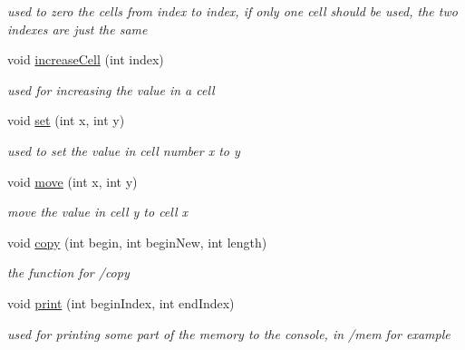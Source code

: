 \begin{DoxyCompactItemize}
\begin{DoxyCompactList}\small\item\em used to zero the cells from index to index, if only one cell should be used, the two indexes are just the same \end{DoxyCompactList}\item 
\mbox{\label{class_machine_a69c8f925175f153c95bf6f8b7a8b7abf}} 
void \mbox{\hyperlink{class_machine_a69c8f925175f153c95bf6f8b7a8b7abf}{increase\+Cell}} (int index)
\begin{DoxyCompactList}\small\item\em used for increasing the value in a cell \end{DoxyCompactList}\item 
\mbox{\label{class_machine_a6292542a71c47da0b55b23f036daed33}} 
void \mbox{\hyperlink{class_machine_a6292542a71c47da0b55b23f036daed33}{set}} (int x, int y)
\begin{DoxyCompactList}\small\item\em used to set the value in cell number x to y \end{DoxyCompactList}\item 
\mbox{\label{class_machine_a95cdc0b6f199b1e124858f57022d677e}} 
void \mbox{\hyperlink{class_machine_a95cdc0b6f199b1e124858f57022d677e}{move}} (int x, int y)
\begin{DoxyCompactList}\small\item\em move the value in cell y to cell x \end{DoxyCompactList}\item 
\mbox{\label{class_machine_ab0cdbd19e5ca743894593b7826103a82}} 
void \mbox{\hyperlink{class_machine_ab0cdbd19e5ca743894593b7826103a82}{copy}} (int begin, int begin\+New, int length)
\begin{DoxyCompactList}\small\item\em the function for /copy \end{DoxyCompactList}\item 
\mbox{\label{class_machine_a4b4928bc14eff97e52bb84b3f774dec6}} 
void \mbox{\hyperlink{class_machine_a4b4928bc14eff97e52bb84b3f774dec6}{print}} (int begin\+Index, int end\+Index)
\begin{DoxyCompactList}\small\item\em used for printing some part of the memory to the console, in /mem for example \end{DoxyCompactList}\item 

\end{DoxyCompactItemize}
